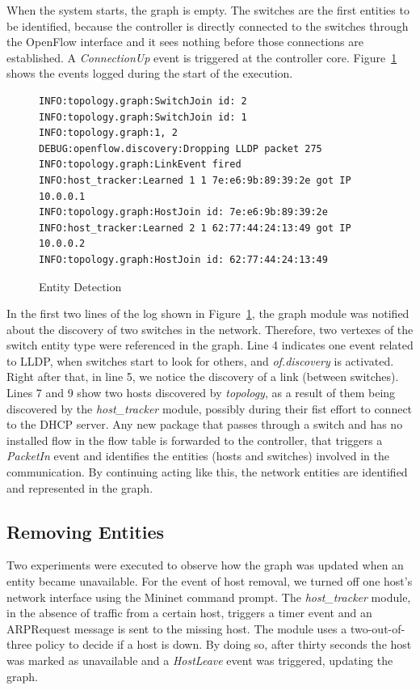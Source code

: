 When the system starts, the graph is empty. 
The switches are the first entities to be identified, because
the controller is directly connected to the switches 
through the OpenFlow interface and it sees nothing before those connections
are established. A \emph{ConnectionUp} event is
triggered at the controller core. Figure~\ref{fig:detection} shows the
events logged during the start of the execution.

\begin{figure}[h!]
\centering
\begin{lstlisting}
INFO:topology.graph:SwitchJoin id: 2
INFO:topology.graph:SwitchJoin id: 1
INFO:topology.graph:1, 2
DEBUG:openflow.discovery:Dropping LLDP packet 275
INFO:topology.graph:LinkEvent fired
INFO:host_tracker:Learned 1 1 7e:e6:9b:89:39:2e got IP 10.0.0.1
INFO:topology.graph:HostJoin id: 7e:e6:9b:89:39:2e
INFO:host_tracker:Learned 2 1 62:77:44:24:13:49 got IP 10.0.0.2
INFO:topology.graph:HostJoin id: 62:77:44:24:13:49
\end{lstlisting}
\caption{Entity Detection}
\label{fig:detection}
\end{figure}

In the first two lines of the log shown in Figure~\ref{fig:detection},
the graph module was notified 
about the discovery of two switches in the network.
Therefore, two vertexes of the switch entity type were 
referenced in the graph.
Line 4 indicates one event related to LLDP, when switches start to look for
others, and \emph{of.discovery} is activated. Right after that,
in line 5, we notice the discovery of a link (between switches).
Lines 7 and 9 show two hosts discovered by \emph{topology}, as a result
of them being discovered by the \emph{host\_tracker} module, possibly
during their fist effort to connect to the DHCP server.
Any new package that passes through a switch and has no installed flow in the
flow table is forwarded to the controller, that triggers a \emph{PacketIn}
event and identifies the entities (hosts and switches) involved in the
communication.
By continuing acting like this, the network entities are identified and
represented in the graph.

\subsection{Removing Entities}

Two experiments were executed to observe how the graph was updated when an
entity became unavailable. For the event of host removal, we turned off one
host's network interface using the Mininet command prompt. The
\emph{host\_tracker} module, in the absence of traffic from a certain host,
triggers a timer event and an ARPRequest message is sent to the missing
host. The module uses a two-out-of-three policy to decide if a host is
down. By doing so, after thirty seconds the host was marked as unavailable
and a \emph{HostLeave} event was triggered, updating the graph.

